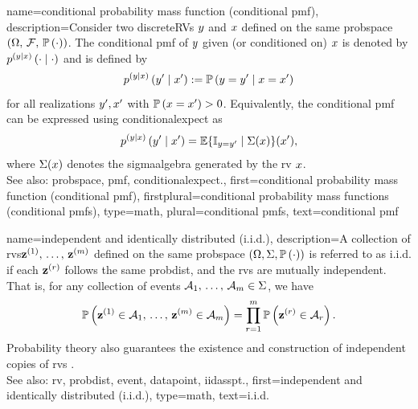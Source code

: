 {name={conditional probability mass function (conditional pmf)}, 
	description={Consider two \glspl{discreteRV} $y$ and $x$ defined on 
                 the same \gls{probspace} $(\Omega,\,\mathcal{F},\,\mathbb{P}\left(\cdot\right))$. 
                 The conditional \gls{pmf} 
                 of $y$ given (or conditioned on) $x$ is denoted by
		$p^{(y \mid x)}\left(\cdot \mid \cdot\right)$ and is defined by
                \[
                  p^{(y \mid x)}\left(y' \mid x'\right)
                  :=
                  \mathbb{P}\left(y=y' \mid x=x'\right)
               \]
                for all \glspl{realization} $y',x'$ with 
                $\mathbb{P}\left(x=x'\right)>0$. 
                Equivalently, the conditional \gls{pmf} can be expressed using 
                \gls{conditionalexpect} as
                \[
                  p^{(y \mid x)}\left(y' \mid x'\right)
                  =
                  \mathbb{E}\{\mathbb{I}_{y=y'}\mid \Sigma(x)\}(x'),
                \]
                where $\Sigma(x)$ denotes the \gls{sigmaalgebra} generated by 
                the \gls{rv} $x$. 
                \\
              See also: \gls{probspace}, \gls{pmf}, \gls{conditionalexpect}.}, 
 	first={conditional probability mass function (conditional pmf)},
 	firstplural={conditional probability mass functions (conditional pmfs)}, 
 	type=math, 
 	plural={conditional pmfs},  
 	text={conditional pmf}
}

{name={independent and identically distributed (i.i.d.)}, 
	description={A collection of \glspl{rv}\linebreak ${\bf z}^{(1)}, \,\ldots, \,{\bf z}^{(m)}$ 
		defined on the same \gls{probspace} $(\Omega, \Sigma, \mathbb{P}\left(\cdot\right))$ is 
		referred to as i.i.d. 
		if each ${\bf z}^{(r)}$ follows the same \gls{probdist}, and 
		the \glspl{rv} are mutually independent. That is, for any collection of 
		\glspl{event} $\mathcal{A}_1, \,\ldots, \,\mathcal{A}_m \in \Sigma$, we have
       		\[
          		\mathbb{P}\left( {\bf z}^{(1)} \in \mathcal{A}_1, \,\ldots, \,{\bf z}^{(m)} \in \mathcal{A}_{m}\right) 
         		= \prod_{r=1}^{m} \mathbb{P}\left( {\bf z}^{(r)} \in \mathcal{A}_r\right).
         	\]
		Probability theory also guarantees the existence and construction of independent copies of \glspl{rv} 
		\cite[Th. 2.19]{klenke2020probability}.
				\\
		See also: \gls{rv}, \gls{probdist}, \gls{event}, \gls{datapoint}, \gls{iidasspt}.},
	first={independent and identically distributed (i.i.d.)},
	type=math, 
	text={{i.i.d.}} 
}

